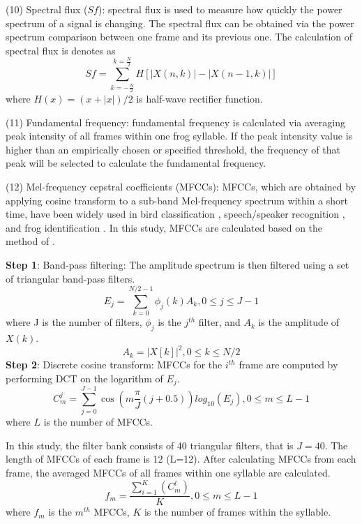 \noindent(10) Spectral flux ($Sf$): spectral flux is used to measure how quickly the power spectrum of a signal is changing. The spectral flux can be obtained via the power spectrum comparison between one frame and its previous one. The calculation of spectral flux is denotes as
\begin{equation}
Sf = \sum_{k=-\frac{N}{2}}^{k=\frac{N}{2}}H[|X(n,k)|-|X(n-1,k)|]
\end{equation}
where $H(x)=(x+|x|)/2$ is half-wave rectifier function.

\vspace{3mm}

\noindent(11) Fundamental frequency: fundamental frequency is calculated via averaging peak intensity of all frames within one frog syllable. If the peak intensity value is higher than an empirically chosen or specified threshold, the frequency of that peak will be selected to calculate the fundamental frequency.

\vspace{3mm}

\noindent(12) Mel-frequency cepstral coefficients (MFCCs): MFCCs, which are obtained by applying cosine transform to a sub-band Mel-frequency spectrum within a short time, have been widely used in bird classification \citep{lee2006automatic}, speech/speaker recognition \citep{han2006efficient}, and frog identification \citep{bedoya2014automatic}. In this study, MFCCs are calculated based on the method of \citep{lee2006automatic}. 

\noindent  \textbf{Step 1}: Band-pass filtering: The amplitude spectrum is then filtered using a set of triangular band-pass filters.
\begin{equation}
E_{j}=\sum_{k=0}^{N/2-1}\phi_{j}(k)A_{k}, 0 \leq j \leq J-1
\end{equation}
where J is the number of filters, $\phi_{j}$ is the $j^{th}$ filter, and $A_{k}$ is the amplitude of $X(k)$.
\begin{equation}
A_{k}=|X[k]|^{2}, 0 \leq k \leq N/2
\end{equation}
\noindent  \textbf{Step 2}: Discrete cosine transform: MFCCs for the $i^{th}$ frame are computed by performing DCT on the logarithm of $E_{j}$. 
\begin{equation}
C_{m}^{j} = \sum_{j=0}^{J-1}\cos(m \frac{\pi}{J}(j+0.5))log_{10}(E_{j}), 0 \leq m \leq L-1
\end{equation}
where $L$ is the number of MFCCs.

In this study, the filter bank consists of 40 triangular filters, that is  $J=40$. The length of MFCCs of each frame is 12 (L=12). After calculating MFCCs from each frame, the averaged MFCCs of all frames within one syllable are calculated.
\begin{equation}
f_{m}= \frac{\sum_{i=1}^{K}(C_{m}^{l})}{K}, 0\leq m \leq L-1
\end{equation}
where $f_{m}$ is the $m^{th}$ MFCCs, $K$ is the number of frames within the syllable. 

